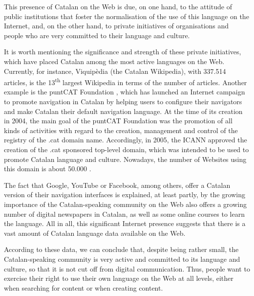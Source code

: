 \begin{multicols}{2}
This presence of Catalan on the Web is due, on one hand, to the attitude of public institutions that foster the normalisation of the use of this language on the Internet, and, on the other hand, to private initiatives of organisations and people who are very committed to their language and culture.


It is worth mentioning the significance and strength of these private initiatives, which have placed Catalan among the most active languages on the Web. Currently, for instance, Viquipèdia (the Catalan Wikipedia), with 337.514 articles, is the 13\textsuperscript{th} largest Wikipedia in terms of the number of articles. Another example is the puntCAT Foundation \cite{CAT-Nota19}, which has launched an Internet campaign to promote navigation in Catalan by helping users to configure their navigators and make Catalan their default navigation language. At the time of its creation in 2004, the main goal of the puntCAT Foundation was the promotion of all kinds of activities with regard to the creation, management and control of the registry of the .cat domain name. Accordingly, in 2005, the ICANN approved the creation of the .cat sponsored top-level domain, which was intended to be used to promote Catalan language and culture. Nowadays, the number of Websites using this domain is about 50.000 \cite{CAT-Nota20}.

The fact that Google, YouTube or Facebook, among others, offer a Catalan version of their navigation interfaces is explained, at least partly, by the growing importance of the Catalan-speaking community on the Web also offers a growing number of digital newspapers in Catalan, as well as some online courses to learn the language. All in all, this significant Internet presence suggests that there is a vast amount of Catalan language data available on the Web. 

According to these data, we can conclude that, despite being rather small, the Catalan-speaking community is very active and committed to its language and culture, so that it is not cut off from digital communication. Thus, people want to exercise their right to use their own language on the Web at all levels, either when searching for content or when creating content. 
\end{multicols}

\clearpage

